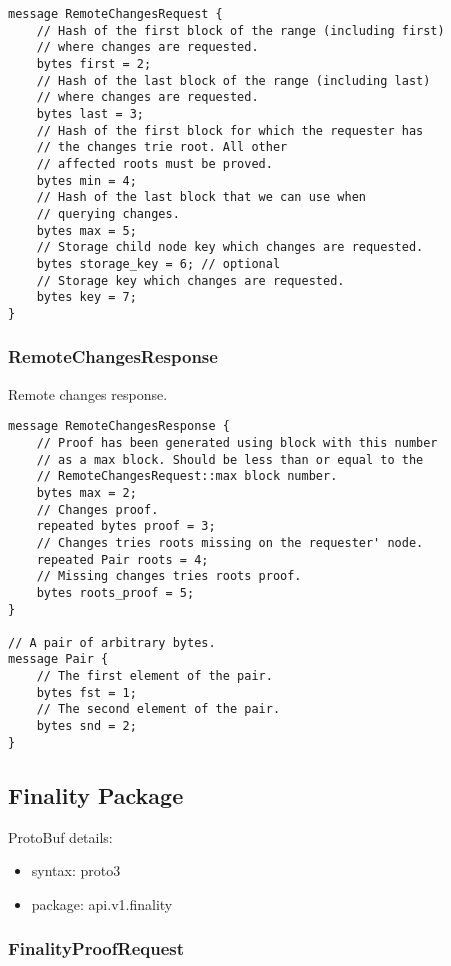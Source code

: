 \documentclass{book}
\begin{document}
\begin{lstlisting}[frame=single]
message RemoteChangesRequest {
    // Hash of the first block of the range (including first)
    // where changes are requested.
    bytes first = 2;
    // Hash of the last block of the range (including last)
    // where changes are requested.
    bytes last = 3;
    // Hash of the first block for which the requester has
    // the changes trie root. All other
    // affected roots must be proved.
    bytes min = 4;
    // Hash of the last block that we can use when
    // querying changes.
    bytes max = 5;
    // Storage child node key which changes are requested.
    bytes storage_key = 6; // optional
    // Storage key which changes are requested.
    bytes key = 7;
}
\end{lstlisting}

\subsubsection{RemoteChangesResponse}

Remote changes response.

\begin{lstlisting}[frame=single]
message RemoteChangesResponse {
    // Proof has been generated using block with this number
    // as a max block. Should be less than or equal to the
    // RemoteChangesRequest::max block number.
    bytes max = 2;
    // Changes proof.
    repeated bytes proof = 3;
    // Changes tries roots missing on the requester' node.
    repeated Pair roots = 4;
    // Missing changes tries roots proof.
    bytes roots_proof = 5;
}

// A pair of arbitrary bytes.
message Pair {
    // The first element of the pair.
    bytes fst = 1;
    // The second element of the pair.
    bytes snd = 2;
}
\end{lstlisting}

\subsection{Finality Package}

ProtoBuf details:

\begin{itemize}
    \item syntax: proto3
    \item package: api.v1.finality
\end{itemize}

\subsubsection{FinalityProofRequest}
\end{document}
